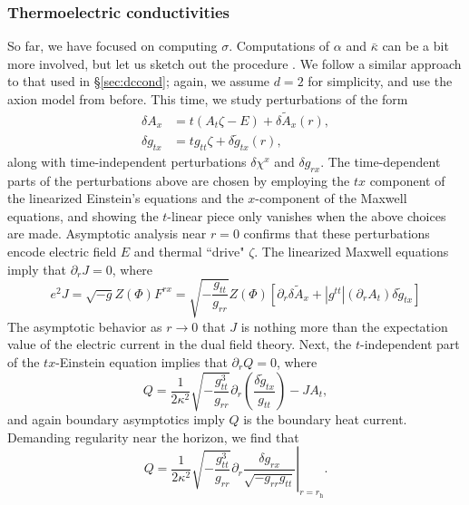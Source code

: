 \documentclass[10pt, oneside]{book}
\begin{document}
\begin{doublespace}
 \subsubsection{Thermoelectric conductivities}
 So far, we have focused on computing $\sigma$.   Computations of $\alpha$ and $\bar\kappa$ can be  a bit more involved, but let us sketch out the procedure \cite{Amoretti:2014zha, Donos:2014cya, Amoretti:2014mma}.   We follow a similar approach to that used in \S \ref{sec:dccond}; again, we assume $d=2$ for simplicity, and use the axion model from before.   This time, we study perturbations of the form \begin{subequations}\begin{align}
 \delta A_x &= t (A_t \zeta - E) + \delta \tilde A_x(r), \\
 \delta g_{tx} &= tg_{tt}\zeta + \delta \tilde g_{tx}(r), 
 \end{align}\end{subequations}
 along with time-independent perturbations $\delta \chi^x$ and $\delta g_{rx}$.  The time-dependent parts of the perturbations above are chosen by employing the $tx$ component of the linearized Einstein's equations and the $x$-component of the Maxwell equations, and showing the $t$-linear piece only vanishes when the above choices are made.   Asymptotic analysis near $r=0$ confirms that these perturbations encode electric field $E$ and thermal ``drive" $\zeta$.   The linearized Maxwell equations imply that $\partial_r J = 0$,  where \begin{equation}
 e^2 J = \sqrt{-g}  Z(\Phi) F^{rx} = \sqrt{-\frac{g_{tt}}{g_{rr}}} Z(\Phi) \left[\partial_r \delta \tilde{A}_x +| g^{tt}| (\partial_r A_t) \delta \tilde{g}_{tx} \right]
 \end{equation}
The asymptotic behavior as $r\rightarrow 0$ that $J$ is nothing more than the expectation value of the electric current in the dual field theory.   Next, the $t$-independent part of the $tx$-Einstein equation implies that $\partial_r Q=0$, where \begin{equation}
Q =\frac{1}{2\kappa^2} \sqrt{-\frac{g_{tt}^3}{g_{rr}}}\partial_r \left(\frac{\delta \tilde{g}_{tx}}{g_{tt}}\right) -  J A_t,
\end{equation}
and again boundary asymptotics imply $Q$ is the boundary heat current.   Demanding regularity near the horizon, we find that \begin{equation}
Q = \left.\frac{1}{2\kappa^2}\sqrt{-\frac{g_{tt}^3}{g_{rr}}}\partial_r \frac{\delta g_{rx}}{\sqrt{-g_{rr}g_{tt}}}\right|_{r=r_{\mathrm{h}}}.

\end{equation}
\end{doublespace}
\end{document}
